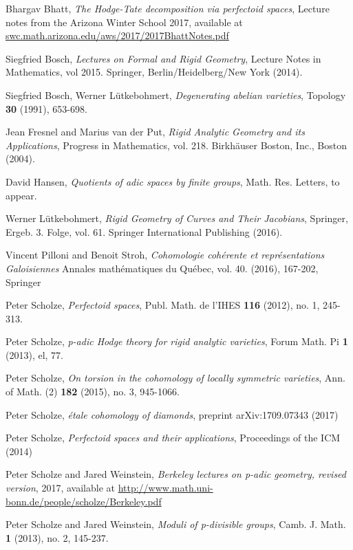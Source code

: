 \documentclass[10pt,oneside]{amsart}
\theoremstyle{definition}
\begin{document}
 
\begin{thebibliography}{99}
	Bhargav Bhatt,
	\textit{The Hodge-Tate decomposition via perfectoid spaces}, Lecture notes from the Arizona Winter School 2017, available at \url{swc.math.arizona.edu/aws/2017/2017BhattNotes.pdf}
		
	Siegfried Bosch,
	\textit{Lectures on Formal and Rigid Geometry}, Lecture Notes in Mathematics, vol 2015. Springer, Berlin/Heidelberg/New York (2014).
	
	Siegfried Bosch, Werner L\"utkebohmert,
	\textit{Degenerating abelian varieties}, Topology {\bf 30} (1991), 653-698.
	
	Jean Fresnel and Marius van der Put,
	\textit{Rigid Analytic Geometry and its Applications}, Progress in Mathematics, vol. 218. Birkh\"auser Boston, Inc., Boston (2004).
	
	David Hansen,
	\textit{Quotients of adic spaces by finite groups}, Math. Res. Letters, to appear.
	
	Werner L\"utkebohmert,
	\textit{Rigid Geometry of Curves and Their Jacobians}, Springer, Ergeb. 3. Folge, vol. 61. Springer International Publishing (2016). 
	
	Vincent Pilloni and  Benoit Stroh,
	\textit{Cohomologie coh{\'e}rente et repr{\'e}sentations Galoisiennes} 
	Annales math{\'e}matiques du Qu{\'e}bec,
		vol. 40. (2016), 167-202, Springer
	
	Peter Scholze,
	\textit{Perfectoid spaces}, Publ. Math. de l'IHES {\bf 116} (2012), no. 1, 245-313.
	
	Peter Scholze,
	\textit{p-adic Hodge theory for rigid analytic varieties}, Forum Math. Pi {\bf 1} (2013), el, 77.
	
	Peter Scholze,
	\textit{On torsion in the cohomology of locally symmetric varieties}, Ann. of Math. (2) {\bf 182} (2015), no. 3, 945-1066.
	
	Peter Scholze,
	\textit{\'etale cohomology of diamonds}, preprint arXiv:1709.07343 (2017)
	
		Peter Scholze,
		\textit{Perfectoid spaces and their applications},
		Proceedings of the ICM (2014)
	
	Peter Scholze and Jared Weinstein,
	\textit{Berkeley lectures on p-adic geometry, revised version}, 2017, available at \url{http://www.math.uni-bonn.de/people/scholze/Berkeley.pdf} 
	
	Peter Scholze and Jared Weinstein,
	\textit{Moduli of p-divisible groups}, Camb. J. Math. {\bf 1} (2013), no. 2, 145-237.
	
\end{thebibliography}

	
	
	
\end{document}
